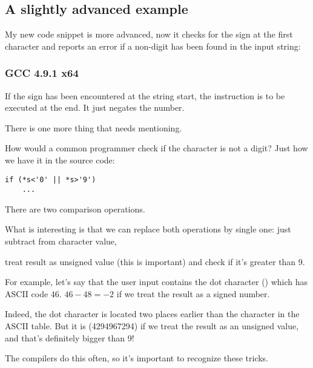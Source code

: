 \subsection{A slightly advanced example}

My new code snippet is more advanced, now it checks for the  sign at the first character
and reports an error if a non-digit has been found in the input string:



\subsubsection{\Optimizing GCC 4.9.1 x64}




If the  sign has been encountered at the string start, the  instruction is to be executed at the end.
It just negates the number.

\label{one_comparison_instead_of_two}
There is one more thing that needs mentioning.

How would a common programmer check if the character is not a digit?
Just how we have it in the source code:

\begin{lstlisting}[style=customc]
if (*s<'0' || *s>'9')
    ...
\end{lstlisting}

There are two comparison operations.

What is interesting is that we can replace both operations by single one:
just subtract  from character value,

treat result as unsigned value (this is important) and check if it's greater than 9.

For example, let's say that the user input contains the dot character () which has \ac{ASCII} code 46.
$46-48=-2$ if we treat the result as a signed number.

Indeed, the dot character is located two places earlier than the  character in the \ac{ASCII} table.
But it is  (4294967294) 
if we treat the result as an unsigned value, and that's definitely bigger than 9!

The compilers do this often, so it's important to recognize these tricks.

